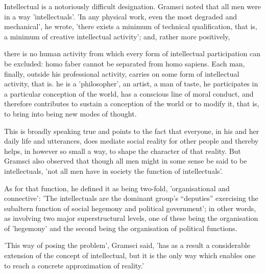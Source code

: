 Intellectual is a notoriously difficult designation. Gramsci noted that all men were in a way 'intellectuals'. 'In any physical work, even the most degraded and mechanical', he wrote, 'there exists a minimum of technical qualification, that is, a minimum of creative intellectual activity'; and, rather more positively,
\begin{displayquote}
    there is no human activity from which every form of intellectual participation can be excluded: homo faber cannot be separated from homo sapiens. Each man, finally, outside his professional activity, carries on some form of intellectual activity, that is. he is a 'philosopher', an artist, a man of taste, he participates in a particular conception of the world, has a conscious line of moral conduct, and therefore contributes to sustain a conception of the world or to modify it, that is, to bring into being new modes of thought.
\end{displayquote}

This is broadly speaking true and points to the fact that everyone, in his and her daily life and utterances, does mediate social reality for other people and thereby helps, in however so small a way, to shape the character of that reality. But Gramsci also observed that though all men might in some sense be said to be intellectuals, 'not all men have in society the function of intellectuals'.

As for that function, he defined it as being two-fold, 'organisational and connective': 'The intellectuals are the dominant group's “deputies” exercising the subaltern function of social hegemony and political government'; in other words, as involving two major superstructural levels, one of these being the organisation of 'hegemony' and the second being the organisation of political functions.

'This way of posing the problem', Gramsci said, 'has as a result a considerable extension of the concept of intellectual, but it is the only way which enables one to reach a concrete approximation of reality.'

